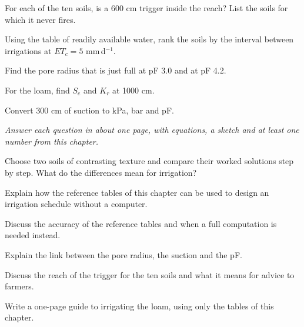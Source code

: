 \begin{exlist}
\item For each of the ten soils, is a 600 cm trigger inside the reach? List the soils for which it never fires.
\item Using the table of readily available water, rank the soils by the interval between irrigations at $ET_c=5$ mm\,d$^{-1}$.
\item Find the pore radius that is just full at pF 3.0 and at pF 4.2.
\item For the loam, find $S_e$ and $K_r$ at 1000 cm.
\item Convert 300 cm of suction to kPa, bar and pF.
\end{exlist}
{\small\itshape Answer each question in about one page, with equations, a sketch and at least one number from this chapter.}\par\vspace{3pt}
\begin{exlist}
\item Choose two soils of contrasting texture and compare their worked solutions step by step. What do the differences mean for irrigation?
\item Explain how the reference tables of this chapter can be used to design an irrigation schedule without a computer.
\item Discuss the accuracy of the reference tables and when a full computation is needed instead.
\item Explain the link between the pore radius, the suction and the pF.
\item Discuss the reach of the trigger for the ten soils and what it means for advice to farmers.
\item Write a one-page guide to irrigating the loam, using only the tables of this chapter.
\end{exlist}

